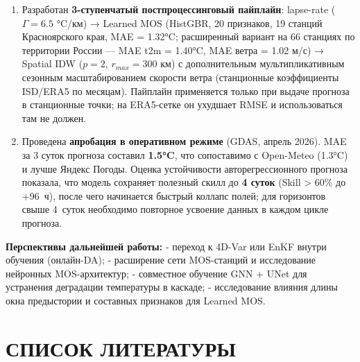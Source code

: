 \documentclass[14pt,a4paper]{extarticle}
\numberwithin{table}{section}
\numberwithin{figure}{section}
\numberwithin{equation}{section}
\begin{document}
\begin{enumerate}
  к ветру.
\item
  Разработан \textbf{3-ступенчатый постпроцессинговый пайплайн}:
  lapse-rate (\(\Gamma=6.5\) °C/км) → Learned MOS (HistGBR, 20
  признаков, 19 станций Красноярского края, MAE = 1.32°C; расширенный
  вариант на 66 станциях по территории России --- MAE
  t2m = 1.40°C, MAE ветра = 1.02 м/с) → Spatial IDW (\(p=2\),
  \(r_{max}=300\) км) с дополнительным мультипликативным сезонным
  масштабированием скорости ветра (станционные коэффициенты
  ISD/ERA5 по месяцам). Пайплайн применяется только при выдаче
  прогноза в станционные точки; на ERA5-сетке он ухудшает RMSE и
  использоваться там не должен.
\item
  Проведена \textbf{апробация в оперативном режиме} (GDAS, апрель 2026).
  MAE за 3 суток прогноза составил \textbf{1.5°C}, что сопоставимо с
  Open-Meteo (1.3°C) и лучше Яндекс Погоды. Оценка устойчивости
  авторегрессионного прогноза показала, что модель сохраняет полезный
  скилл до \textbf{4 суток} (Skill > 60\% до +96~ч), после чего
  начинается быстрый коллапс полей; для горизонтов свыше 4~суток
  необходимо повторное усвоение данных в каждом цикле прогноза.
\end{enumerate}

\textbf{Перспективы дальнейшей работы:} - переход к 4D-Var или EnKF
внутри обучения (онлайн-DA); - расширение сети MOS-станций и
исследование нейронных MOS-архитектур; - совместное обучение GNN + UNet
для устранения деградации температуры в каскаде; - исследование влияния
длины окна предыстории и составных признаков для Learned MOS.


\newpage

\section*{СПИСОК ЛИТЕРАТУРЫ}
\end{document}
